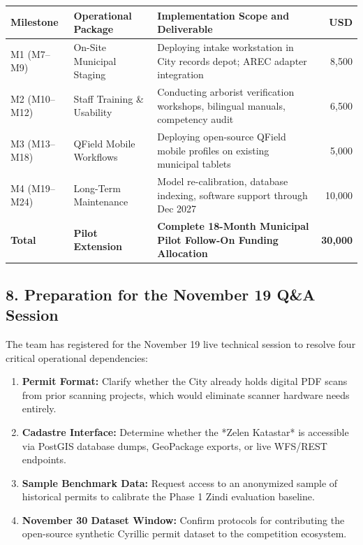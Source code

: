 \documentclass[9pt,a4paper]{article}
\begin{document}
\vspace{0.1em}
\renewcommand{\arraystretch}{0.89}
\begin{tabularx}{\textwidth}{@{}llXr@{}}
\toprule
\textsf{\textbf{\fontsize{8pt}{10pt}\selectfont Milestone}} & \textsf{\textbf{\fontsize{8pt}{10pt}\selectfont Operational Package}} & \textsf{\textbf{\fontsize{8pt}{10pt}\selectfont Implementation Scope and Deliverable}} & \textsf{\textbf{\fontsize{8pt}{10pt}\selectfont USD}} \\
\midrule
M1 (M7--M9) & On-Site Municipal Staging & Deploying intake workstation in City records depot; AREC adapter integration & 8,500 \\
M2 (M10--M12) & Staff Training \& Usability & Conducting arborist verification workshops, bilingual manuals, competency audit & 6,500 \\
M3 (M13--M18) & QField Mobile Workflows & Deploying open-source QField mobile profiles on existing municipal tablets & 5,000 \\
M4 (M19--M24) & Long-Term Maintenance & Model re-calibration, database indexing, software support through Dec 2027 & 10,000 \\
\midrule
\textbf{Total} & \textbf{Pilot Extension} & \textbf{Complete 18-Month Municipal Pilot Follow-On Funding Allocation} & \textbf{30,000} \\
\bottomrule
\end{tabularx}

\vspace{0.2em}
\subsection*{8. Preparation for the November 19 Q\&A Session}
The team has registered for the November 19 live technical session to resolve four critical operational dependencies:
\begin{enumerate}[leftmargin=1.4em, itemsep=0.02em]
  \item \textbf{Permit Format:} Clarify whether the City already holds digital PDF scans from prior scanning projects, which would eliminate scanner hardware needs entirely.
  \item \textbf{Cadastre Interface:} Determine whether the *Zelen Katastar* is accessible via PostGIS database dumps, GeoPackage exports, or live WFS/REST endpoints.
  \item \textbf{Sample Benchmark Data:} Request access to an anonymized sample of historical permits to calibrate the Phase 1 Zindi evaluation baseline.
  \item \textbf{November 30 Dataset Window:} Confirm protocols for contributing the open-source synthetic Cyrillic permit dataset to the competition ecosystem.
\end{enumerate}
\end{document}
